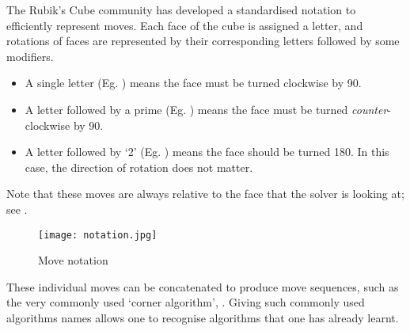 The Rubik's Cube community has developed a standardised notation to efficiently represent moves.
Each face of the cube is assigned a letter, and rotations of faces are represented by their corresponding letters followed by some modifiers.
\begin{itemize}
	\item A single letter (Eg. ) means the face must be turned clockwise by 90\degree .
	\item A letter followed by a prime (Eg. ) means the face must be turned \emph{counter}-clockwise by 90\degree .
	\item A letter followed by `2' (Eg. ) means the face should be turned 180\degree . In this case, the direction of rotation does not matter.
\end{itemize}
Note that these moves are always relative to the face that the solver is looking at; see .
\begin{figure}[h]
	\centering
	\texttt{[image: notation.jpg]}
	\caption{Move notation}\label{fig:notation}
\end{figure}
These individual moves can be concatenated to produce move sequences, such as the very commonly used `corner algorithm', . Giving such commonly used algorithms names allows one to recognise algorithms that one has already learnt.